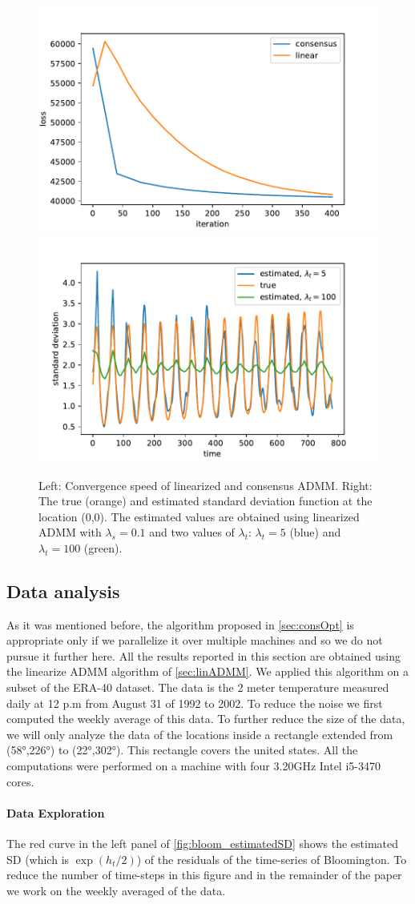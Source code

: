 \documentclass{article}
\begin{document}
\begin{figure}[!h]
	\centering	
	\includegraphics[width=.4\linewidth]{Figures/convergence}			
	\includegraphics[width=.4\linewidth]{Figures/true_fitted_var}		
	\caption{Left: Convergence speed of linearized and consensus ADMM. Right: The true (orange) and estimated standard deviation function at the location (0,0). The estimated values are obtained using linearized ADMM with $\lambda_s=0.1$ and two values of $\lambda_t$: $\lambda_t=5$ (blue) and $\lambda_t=100$ (green).} \label{fig:true_fitted_var}
\end{figure}

\subsection{Data analysis}
As it was mentioned before, the algorithm proposed in \autoref{sec:consOpt} is appropriate only if we parallelize it over multiple machines and so we do not pursue it further here. All the results reported in this section are obtained using the linearize ADMM algorithm of \autoref{sec:linADMM}. We applied this algorithm on a subset of the ERA-40 dataset. The data is the 2 meter temperature measured daily at 12 p.m from August 31 of 1992 to 2002. To reduce the noise we first computed the weekly average of this data. To further reduce the size of the data, we will only analyze the data of the locations inside a rectangle extended from (\ang{58},\ang{226}) to (\ang{22},\ang{302}). This rectangle covers the united states. All the computations were performed on a machine with four 3.20GHz Intel i5-3470 cores.

\paragraph{Data Exploration}
The red curve in the left panel of \autoref{fig:bloom_estimatedSD} shows the estimated SD (which is $\exp(h_t/2)$) of the residuals of the time-series of Bloomington. To reduce the number of time-steps in this figure and in the remainder of the paper we work on the weekly averaged of the data. 
\end{document}
